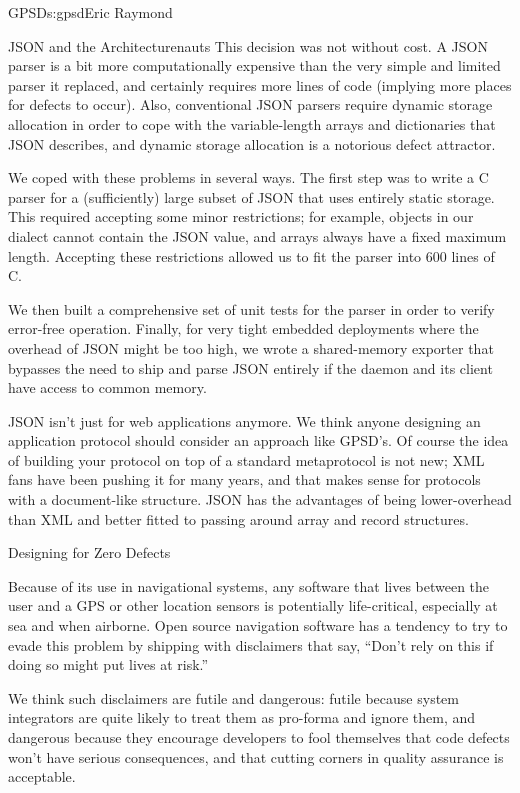 \begin{aosachapter}{GPSD}{s:gpsd}{Eric Raymond}
\begin{aosasect1}{JSON and the Architecturenauts}
This decision was not without cost.  A JSON parser is a bit more
computationally expensive than the very simple and limited parser it
replaced, and certainly requires more lines of code (implying more
places for defects to occur). Also, conventional JSON parsers require
dynamic storage allocation in order to cope with the variable-length
arrays and dictionaries that JSON describes, and dynamic storage
allocation is a notorious defect attractor.

We coped with these problems in several ways. The first step was to
write a C parser for a (sufficiently) large subset of JSON that uses
entirely static storage.  This required accepting some minor
restrictions; for example, objects in our dialect cannot contain the
JSON  value, and arrays always have a fixed maximum length.
Accepting these restrictions allowed us to fit the parser into 600
lines of C.

We then built a comprehensive set of unit tests for the parser 
in order to verify error-free operation. Finally, for very tight
embedded deployments where the overhead of JSON might be too high,
we wrote a shared-memory exporter that bypasses the need to
ship and parse JSON entirely if the daemon and its client have
access to common memory.

JSON isn't just for web applications anymore.  We think anyone
designing an application protocol should consider an approach like
GPSD's.  Of course the idea of building your protocol on top of a
standard metaprotocol is not new; XML fans have been pushing it for
many years, and that makes sense for protocols with a document-like
structure. JSON has the advantages of being lower-overhead than XML
and better fitted to passing around array and record structures.

\end{aosasect1}

\begin{aosasect1}{Designing for Zero Defects}

Because of its use in navigational systems, any software that lives
between the user and a GPS or other location sensors is potentially
life-critical, especially at sea and when airborne.  Open source
navigation software has a tendency to try to evade this problem by
shipping with disclaimers that say, ``Don't rely on this if doing so
might put lives at risk.''

We think such disclaimers are futile and dangerous: futile because
system integrators are quite likely to treat them as pro-forma and
ignore them, and dangerous because they encourage developers to fool
themselves that code defects won't have serious consequences, and that
cutting corners in quality assurance is acceptable.


\end{aosasect1}
\end{aosachapter}
